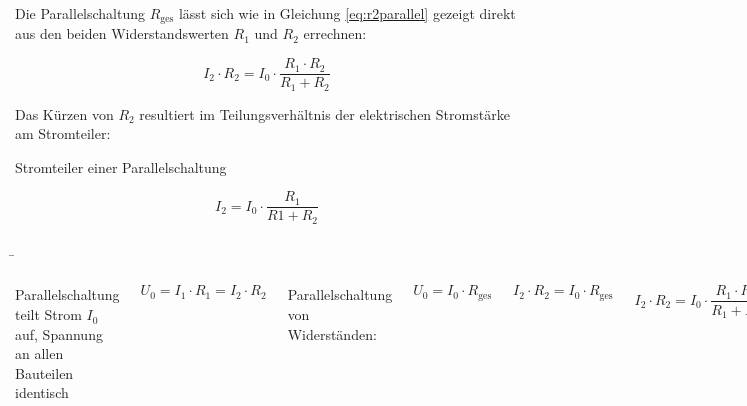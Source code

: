 \begin{frame}
{		Die Parallelschaltung $R_\mathrm{ges}$ lässt sich wie in Gleichung \ref{eq:r2parallel} gezeigt direkt aus den beiden Widerstandswerten
		$R_1$ und $R_2$ errechnen:
		
		\begin{equation*}
			I_2 \cdot R_2 = I_0 \cdot \frac{R_1 \cdot R_2}{R_1 + R_2}
		\end{equation*}
		
		Das Kürzen von $R_2$ resultiert im Teilungsverhältnis der elektrischen Stromstärke am Stromteiler:
		
		\begin{Merksatz}{Stromteiler einer Parallelschaltung}
			
			\begin{equation}
				I_2 = I_0 \cdot \frac{R_1}{R1 + R_2}
			\end{equation}
		\end{Merksatz}
		
		
	}
	
	
	\b{
		\begin{columns}
			
			Parallelschaltung teilt Strom $I_0$ auf,
			Spannung an allen Bauteilen identisch
			
			\begin{equation*}
				U_0 = I_1 \cdot R_1 = I_2 \cdot R_2
			\end{equation*}
			
			Parallelschaltung von Widerständen: 
			
			\begin{equation*}
				U_0 = I_0 \cdot R_\mathrm{ges}
			\end{equation*}
			\vspace*{-10pt}
			
			\begin{equation*}
				I_2 \cdot R_2 = I_0 \cdot R_\mathrm{ges}
			\end{equation*}
			
			\begin{equation*}
				I_2 \cdot R_2  = I_0 \cdot \frac{R_1 \cdot R_2}{R_1 + R_2}
			\end{equation*}
			

\end{columns}}
\end{frame}
